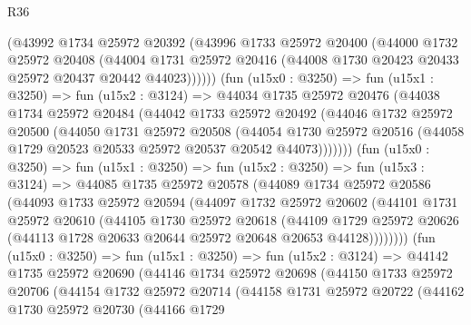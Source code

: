 \begin{lexlean}{R36}
\begin{coremodule}
          (@43992
            @1734
            @25972
            @20392
            (@43996
              @1733
              @25972
              @20400
              (@44000
                @1732
                @25972
                @20408
                (@44004
                  @1731
                  @25972
                  @20416
                  (@44008 @1730 @20423 @20433 @25972 @20437 @20442 @44023))))))
        (fun (u15x0 : @3250) =>
        fun (u15x1 : @3250) =>
        fun (u15x2 : @3124) =>
        @44034
          @1735
          @25972
          @20476
          (@44038
            @1734
            @25972
            @20484
            (@44042
              @1733
              @25972
              @20492
              (@44046
                @1732
                @25972
                @20500
                (@44050
                  @1731
                  @25972
                  @20508
                  (@44054
                    @1730
                    @25972
                    @20516
                    (@44058 @1729 @20523 @20533 @25972 @20537 @20542 @44073)))))))
        (fun (u15x0 : @3250) =>
        fun (u15x1 : @3250) =>
        fun (u15x2 : @3250) =>
        fun (u15x3 : @3124) =>
        @44085
          @1735
          @25972
          @20578
          (@44089
            @1734
            @25972
            @20586
            (@44093
              @1733
              @25972
              @20594
              (@44097
                @1732
                @25972
                @20602
                (@44101
                  @1731
                  @25972
                  @20610
                  (@44105
                    @1730
                    @25972
                    @20618
                    (@44109
                      @1729
                      @25972
                      @20626
                      (@44113 @1728 @20633 @20644 @25972 @20648 @20653 @44128))))))))
        (fun (u15x0 : @3250) =>
        fun (u15x1 : @3250) =>
        fun (u15x2 : @3124) =>
        @44142
          @1735
          @25972
          @20690
          (@44146
            @1734
            @25972
            @20698
            (@44150
              @1733
              @25972
              @20706
              (@44154
                @1732
                @25972
                @20714
                (@44158
                  @1731
                  @25972
                  @20722
                  (@44162
                    @1730
                    @25972
                    @20730
                    (@44166
                      @1729

\end{coremodule}
\end{lexlean}
